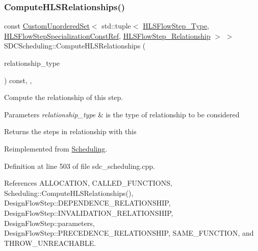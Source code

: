 \subsubsection{\texorpdfstring{Compute\+H\+L\+S\+Relationships()}{ComputeHLSRelationships()}}
{\footnotesize\ttfamily const \hyperlink{classCustomUnorderedSet}{Custom\+Unordered\+Set}$<$ std\+::tuple$<$ \hyperlink{hls__step_8hpp_ada16bc22905016180e26fc7e39537f8d}{H\+L\+S\+Flow\+Step\+\_\+\+Type}, \hyperlink{hls__step_8hpp_a5fdd2edf290c196531d21d68e13f0e74}{H\+L\+S\+Flow\+Step\+Specialization\+Const\+Ref}, \hyperlink{hls__step_8hpp_a3ad360b9b11e6bf0683d5562a0ceb169}{H\+L\+S\+Flow\+Step\+\_\+\+Relationship} $>$ $>$ S\+D\+C\+Scheduling\+::\+Compute\+H\+L\+S\+Relationships (\begin{DoxyParamCaption}\item[{const \hyperlink{classDesignFlowStep_a723a3baf19ff2ceb77bc13e099d0b1b7}{Design\+Flow\+Step\+::\+Relationship\+Type}}]{relationship\+\_\+type }\end{DoxyParamCaption}) const\hspace{0.3cm}{\ttfamily [override]}, {\ttfamily [protected]}, {\ttfamily [virtual]}}



Compute the relationship of this step. 


\begin{DoxyParams}{Parameters}
{\em relationship\+\_\+type} & is the type of relationship to be considered \\
\hline
\end{DoxyParams}
\begin{DoxyReturn}{Returns}
the steps in relationship with this 
\end{DoxyReturn}


Reimplemented from \hyperlink{classScheduling_a60e98bfbe377334ea3f3c0de2f2ab758}{Scheduling}.



Definition at line 503 of file sdc\+\_\+scheduling.\+cpp.



References A\+L\+L\+O\+C\+A\+T\+I\+ON, C\+A\+L\+L\+E\+D\+\_\+\+F\+U\+N\+C\+T\+I\+O\+NS, Scheduling\+::\+Compute\+H\+L\+S\+Relationships(), Design\+Flow\+Step\+::\+D\+E\+P\+E\+N\+D\+E\+N\+C\+E\+\_\+\+R\+E\+L\+A\+T\+I\+O\+N\+S\+H\+IP, Design\+Flow\+Step\+::\+I\+N\+V\+A\+L\+I\+D\+A\+T\+I\+O\+N\+\_\+\+R\+E\+L\+A\+T\+I\+O\+N\+S\+H\+IP, Design\+Flow\+Step\+::parameters, Design\+Flow\+Step\+::\+P\+R\+E\+C\+E\+D\+E\+N\+C\+E\+\_\+\+R\+E\+L\+A\+T\+I\+O\+N\+S\+H\+IP, S\+A\+M\+E\+\_\+\+F\+U\+N\+C\+T\+I\+ON, and T\+H\+R\+O\+W\+\_\+\+U\+N\+R\+E\+A\+C\+H\+A\+B\+LE.

